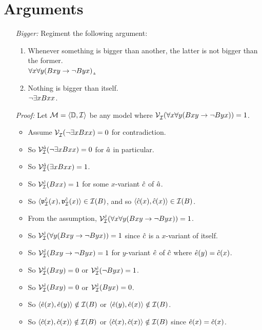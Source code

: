 \documentclass[a4paper, 11pt]{article} %
\begin{document}
\section*{Arguments}

\begin{enumerate}
  \item[\it Bigger:] Regiment the following argument:
    \begin{enumerate}
      \item Whenever something is bigger than another, the latter is not bigger than the former.\\
        \underline{$\forall x\forall y(Bxy \rightarrow \neg Byx)$.\quad}
      \item Nothing is bigger than itself.\\
        $\neg\exists x Bxx$.
    \end{enumerate}
  \item[\it Proof:] Let $\mathcal{M}=\langle\mathbb{D},\mathcal{I}\rangle$ be any model where $\mathcal{V}_{\mathcal{I}}^{}(\forall x\forall y(Bxy \rightarrow \neg Byx)) = 1$.
    \begin{itemize}
      \item Assume $\mathcal{V}_{\mathcal{I}}^{}(\neg\exists x Bxx) = 0$ for contradiction. 
      \item So $\mathcal{V}_{\mathcal{I}}^{\hat{a}}(\neg\exists x Bxx) = 0$ for $\hat{a}$ in particular.
      \item So $\mathcal{V}_{\mathcal{I}}^{\hat{a}}(\exists x Bxx)=1$.
      \item So $\mathcal{V}_{\mathcal{I}}^{\hat{c}}(Bxx)=1$ for some $x$-variant $\hat{c}$ of $\hat{a}$.
      \item So $\langle\mathfrak{v}_{\mathcal{I}}^{\hat{c}}(x),\mathfrak{v}_{\mathcal{I}}^{\hat{c}}(x)\rangle\in\mathcal{I}(B)$, and so $\langle\hat{c}(x),\hat{c}(x)\rangle\in\mathcal{I}(B)$.
      \item From the assumption, $\mathcal{V}_{\mathcal{I}}^{\hat{c}}(\forall x\forall y(Bxy \rightarrow \neg Byx))=1$.
      \item So $\mathcal{V}_{\mathcal{I}}^{\hat{c}}(\forall y(Bxy \rightarrow \neg Byx))=1$ since $\hat{c}$ is a $x$-variant of itself.
      \item So $\mathcal{V}_{\mathcal{I}}^{\hat{e}}(Bxy \rightarrow \neg Byx)=1$ for $y$-variant $\hat{e}$ of $\hat{c}$ where $\hat{e}(y)=\hat{c}(x)$.
      \item So $\mathcal{V}_{\mathcal{I}}^{\hat{e}}(Bxy) = 0$ or $\mathcal{V}_{\mathcal{I}}^{\hat{e}}(\neg Byx)=1$.
      \item So $\mathcal{V}_{\mathcal{I}}^{\hat{e}}(Bxy) = 0$ or $\mathcal{V}_{\mathcal{I}}^{\hat{e}}(Byx) = 0$.
      \item So $\langle\hat{e}(x),\hat{e}(y)\rangle\notin\mathcal{I}(B)$ or $\langle\hat{e}(y),\hat{e}(x)\rangle\notin\mathcal{I}(B)$.
      \item So $\langle\hat{c}(x),\hat{c}(x)\rangle\notin\mathcal{I}(B)$ or $\langle\hat{c}(x),\hat{c}(x)\rangle\notin\mathcal{I}(B)$ since $\hat{e}(x)=\hat{c}(x)$.

\end{itemize}
\end{enumerate}
\end{document}
